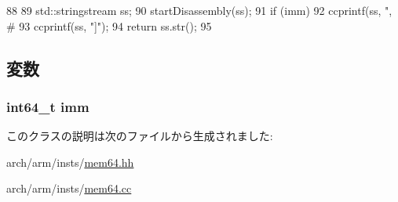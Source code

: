 \begin{DoxyCode}
88 {
89     std::stringstream ss;
90     startDisassembly(ss);
91     if (imm)
92         ccprintf(ss, ", #%
93     ccprintf(ss, "]");
94     return ss.str();
95 }
\end{DoxyCode}


\subsection{変数}
\hypertarget{classArmISA_1_1MemoryImm64_a11b34c3ceec32cc1f14d0ca9c099c470}{
\subsubsection[{imm}]{\setlength{\rightskip}{0pt plus 5cm}int64\_\-t {\bf imm}}}
\label{classArmISA_1_1MemoryImm64_a11b34c3ceec32cc1f14d0ca9c099c470}


このクラスの説明は次のファイルから生成されました:\begin{DoxyCompactItemize}
\item 
arch/arm/insts/\hyperlink{mem64_8hh}{mem64.hh}\item 
arch/arm/insts/\hyperlink{mem64_8cc}{mem64.cc}\end{DoxyCompactItemize}
